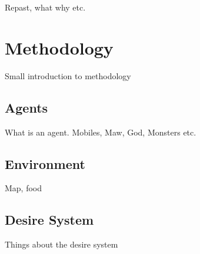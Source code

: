 \documentclass[conference]{IEEEtran}
\begin{document}
Repast, what why etc.











\section{Methodology}
Small introduction to methodology








\subsection{Agents}
What is an agent. Mobiles, Maw, God, Monsters etc.



\subsection{Environment}
Map, food











\subsection{Desire System}
Things about the desire system
\end{document}
